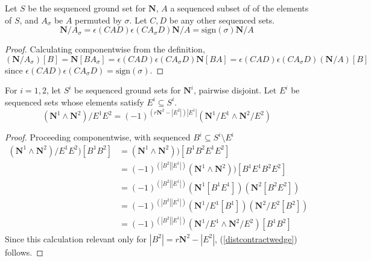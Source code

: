 \documentclass[Unicode]{cedram-alco}
\newcommand{\ext}[1]{\ensuremath{\mathbf{#1}}}
\begin{document}
    \begin{prop}\label{permuteContraction}
      Let $S$ be the sequenced ground set for $\ext{N}$, $A$ a sequenced subset of
      of the elements of $S$, and $A_\sigma$ be $A$ permuted by $\sigma$.  Let $C, D$ be any other sequenced
      sets.
      \begin{equation}
        \ext{N}/A_\sigma = \epsilon(CAD)\epsilon(CA_\sigma D)\ext{N}/A = \text{sign}(\sigma)\ext{N}/A
      \end{equation}
    \end{prop}
    \begin{proof}
      Calculating componentwise from the definition,
      \[
      (\ext{N}/A_\sigma)[B]=\ext{N}[BA_\sigma]=\epsilon(CAD)\epsilon(CA_\sigma D)\ext{N}[BA]=
      \epsilon(CAD)\epsilon(CA_\sigma D)(\ext{N}/A)[B]
      \]
      since $\epsilon(CAD)\epsilon(CA_\sigma D)=\text{sign}(\sigma)$.
    \end{proof}


    \begin{prop}
      For $i=1, 2$, let $S^{i}$ be sequenced ground sets for $\ext{N}^{i}$, pairwise disjoint.
      Let $E^i$ be sequenced sets whose elements satisfy $E^i\subseteq S^i$.
      \begin{equation}\label{distcontractwedge}
        (\ext{N}^1 \wedge \ext{N}^2)/E^1E^2 = (-1)^{(r\ext{N}^2-|E^2|) |E^1|} (\ext{N}^1/E^1 \wedge \ext{N}^2/E^2)
      \end{equation}
    \end{prop}
    \begin{proof}
      Proceeding componentwise, with sequenced $B^i\subseteq S^i\setminus E^i$
      \begin{equation}
        \begin{split}
      (\ext{N}^1 \wedge \ext{N}^2)/E^1E^2)[B^1B^2]
      &=(\ext{N}^1 \wedge \ext{N}^2))[B^1B^2E^1E^2]
      \\
      &=(-1)^{(|B^2| |E^1|)} (\ext{N}^1 \wedge \ext{N}^2))[B^1E^1B^2E^2]
      \\
      &=(-1)^{(|B^2| |E^1|)} (\ext{N}^1[B^1E^1])( \ext{N}^2[B^2E^2])
      \\
      &=(-1)^{(|B^2| |E^1|)} (\ext{N}^1/E^1[B^1])( \ext{N}^2/E^2[B^2])
      \\
      &=(-1)^{(|B^2| |E^1|)} (\ext{N}^1/E^1 \wedge \ext{N}^2/E^2)[B^1B^2]
        \end{split}
      \end{equation}
      Since this calculation relevant only for $|B^2|=r\ext{N}^2-|E^2|$, (\ref{distcontractwedge}) follows.
    \end{proof}
\end{document}
